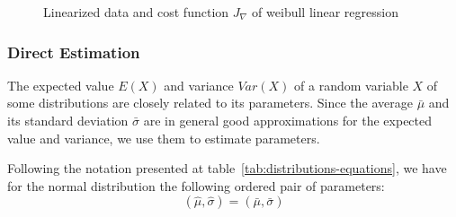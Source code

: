 \begin{figure}[ht!]
\centering
{}
\label{fig:linearization-cost}
\caption{Linearized data and cost function $J_\nabla$ of weibull linear regression}
\end{figure}



\subsubsection{Direct Estimation}

The expected value $E(X)$ and variance $Var(X)$ of a random variable $X$ of some distributions are closely related to its parameters. Since the average $\bar{\mu}$ and its standard deviation $\bar{\sigma}$ are in general good approximations for the expected value and variance, we use them to estimate parameters.

Following the notation presented at table~\ref{tab:distributions-equations}, we have for the normal distribution the following ordered pair of parameters:
\begin{equation}
(\hat{\mu}, \hat{\sigma}) = (\bar{\mu}, \bar{\sigma})
\end{equation}

